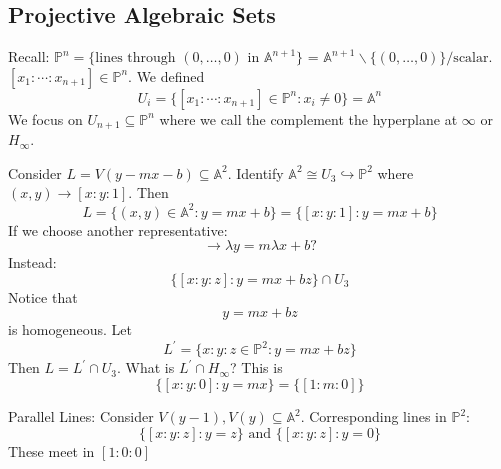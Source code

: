 \documentclass{report}
\begin{document}
\begin{topic}
    \section{Projective Algebraic Sets}
\end{topic}

Recall: $\mathbb{P}^{n} = \{\text{lines through $(0, \ldots, 0)$ in $\mathbb{A}^{n + 1}$}\}$ = $\mathbb{A}^{n + 1}\backslash\{(0, \ldots, 0)\} / \text{scalar}$. $[x_{1} : \cdots : x_{n + 1}] \in \mathbb{P}^{n}$. We defined
    \begin{equation*}
        U_{i} = \{[x_{1}: \cdots: x_{n + 1}] \in \mathbb{P}^{n} : x_{i} \neq 0\} = \mathbb{A}^{n}
    \end{equation*}
We focus on $U_{n + 1} \subseteq \mathbb{P}^{n}$ where we call the complement the hyperplane at $\infty$ or $H_{\infty}$.
%
\begin{examples}
    \begin{example}
        Consider $L = V(y - mx - b) \subseteq \mathbb{A}^{2}$. Identify $\mathbb{A}^{2} \cong U_{3} \hookrightarrow \mathbb{P}^{2}$ where $(x, y) \rightarrow [x : y : 1]$. Then
            \begin{equation*}
                L = \{(x, y) \in \mathbb{A}^{2} : y = mx + b\} = \{[x : y : 1] : y = mx + b\}
            \end{equation*}
        If we choose another representative:
            \begin{equation*}
                [\lambda x : \lambda y: \lambda] \rightarrow\lambda y = m\lambda x + b ?
            \end{equation*}
        Instead:
            \begin{equation*}
                \{[x : y : z] : y = mx + bz\} \cap U_{3}
            \end{equation*}
        Notice that
            \begin{equation*}
                y = mx + bz
            \end{equation*}
        is homogeneous. Let
            \begin{equation*}
                L^{\prime} = \{x : y : z \in \mathbb{P}^{2} : y = mx + bz\}
            \end{equation*}
        Then $L = L^{\prime} \cap U_{3}$. What is $L^{\prime} \cap H_{\infty}$? This is
            \begin{equation*}
                \{[x : y : 0] : y = mx\} = \{[1 : m : 0]\}
            \end{equation*}
    \end{example}
    \begin{example}
        Parallel Lines: Consider $V(y - 1), V(y) \subseteq \mathbb{A}^{2}$. Corresponding lines in $\mathbb{P}^{2}$:
            \begin{equation*}
                \{[x : y : z] : y = z\} \text{ and } \{[x : y : z] : y = 0\}
            \end{equation*}
        These meet in $[1 : 0 : 0]$
    \end{example}
\end{examples}
\end{document}
